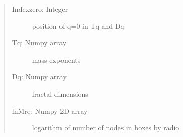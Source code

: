 \documentclass[letterpaper,10pt,english]{sphinxmanual}
\begin{document}
\begin{fulllineitems}
\begin{quote}
\begin{description}
\begin{description}
\item[{Indexzero: Integer}] \leavevmode
position of q=0 in Tq and Dq

\item[{Tq: Numpy array}] \leavevmode
mass exponents

\item[{Dq: Numpy array}] \leavevmode
fractal dimensions

\item[{lnMrq: Numpy 2D array}] \leavevmode
logarithm of number of nodes in boxes by radio

\end{description}


\end{description}\end{quote}

\end{fulllineitems}

\end{document}
